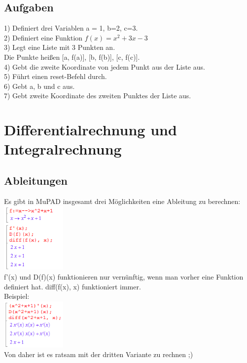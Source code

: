 \documentclass[11pt,final]{scrreprt}
\begin{document}
\subsection{Aufgaben}
1) Definiert drei Variablen a = 1, b=2, c=3.\\
2) Definiert eine Funktion $f(x) = x^2+3x-3$\\
3) Legt eine Liste mit 3 Punkten an.\\
\hspace*{1em} Die Punkte heißen [a, f(a)], [b, f(b)], [c, f(c)].\\
4) Gebt die zweite Koordinate von jedem Punkt aus der Liste aus.\\
5) Führt einen reset-Befehl durch.\\
6) Gebt a, b und c aus.\\
7) Gebt zweite Koordinate des zweiten Punktes der Liste aus.

\section{Differentialrechnung und Integralrechnung}

\subsection{Ableitungen}
Es gibt in MuPAD insgesamt drei Möglichkeiten eine Ableitung zu berechnen:\\
\includegraphics[width = 120px]{images/ableitungen_1}\\
f'(x) und D(f)(x) funktionieren nur vernünftig, wenn man vorher eine Funktion definiert hat. diff(f(x), x) funktioniert immer.\\
Beispiel:\\
\includegraphics[width = 120px]{images/ableitungen_2}\\
Von daher ist es ratsam mit der dritten Variante zu rechnen ;)
\end{document}
